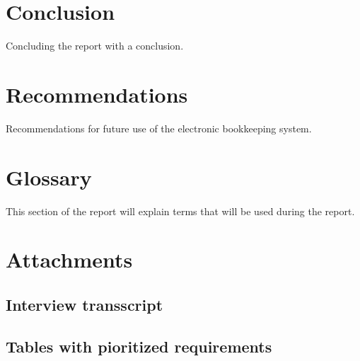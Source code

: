 \documentclass[paper=a4, fontsize=11pt,twoside]{scrartcl}	%
\begin{document}
\newpage
\section{Conclusion}
Concluding the report with a conclusion.
\newpage
\section{Recommendations}
Recommendations for future use of the electronic bookkeeping system.
\newpage

\section{Glossary}
This section of the report will explain terms that will be used during the report. 


\newpage


 
\newpage

\section{Attachments}

\subsection{Interview transscript}


\subsection{Tables with pioritized requirements}




\end{document}
